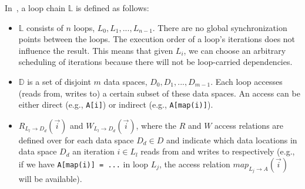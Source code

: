 In~\cite{ST-KriegerHIPS2013,KriegerThesis}, a loop chain $\mathbb{L}$ is defined as follows:
\begin{itemize}
\item $\mathbb{L}$ consists of $n$ loops, $L_0, L_1, ..., L_{n-1}$. There are no global synchronization points between the loops. The execution order of a loop's iterations does not influence the result. This means that given $L_i$, we can choose an arbitrary scheduling of iterations because there will not be loop-carried dependencies. 
\item $\mathbb{D}$ is a set of disjoint $m$ data spaces, $D_0, D_1, ..., D_{m-1}$. Each loop accesses (reads from, writes to) a certain subset of these data spaces. An access can be either direct (e.g., \texttt{A[i]}) or indirect (e.g., \texttt{A[map(i)]}).
\item $R_{L_l\rightarrow D_d}(\vec{i})$ and $W_{L_l\rightarrow D_d}(\vec{i})$, where the $R$ and $W$ access relations are defined over for each data space $D_d \in D$ and indicate which data locations in data space $D_d$ an iteration $i \in L_l$ reads from and writes to respectively (e.g., if we have \texttt{A[map(i)] = ...} in loop $L_j$, the access relation $map_{L_j\rightarrow A}(\vec{i})$ will be available). 
\end{itemize}

